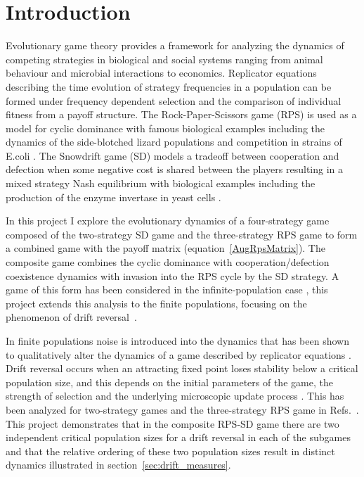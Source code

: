 \documentclass[%
 reprint,
 amsmath,amssymb,
 aps,
]{revtex4-2}
\begin{document}

\section{\label{sec:level1}Introduction}


Evolutionary game theory provides a framework for analyzing the dynamics of 
competing strategies in biological and social systems ranging from animal behaviour \cite{rps_lizard} and
microbial interactions \cite{cheating_microbes,yeast_snowdrift} to economics.
Replicator equations \cite{evolution_pop_dynamics,evolution_maynard} describing the 
time evolution of strategy frequencies in a population can be formed under frequency dependent selection 
and the comparison of individual fitness from a payoff structure. The Rock-Paper-Scissors game (RPS)
is used as a model for cyclic dominance with famous biological examples including the 
dynamics of the side-blotched lizard populations \cite{rps_lizard} and competition in strains of E.coli \cite{rps_ecoli}.
The Snowdrift game (SD) models a tradeoff between cooperation and defection when some negative cost is shared between 
the players resulting in a mixed strategy Nash equilibrium \cite{evolution_maynard} with biological examples including 
the production of the enzyme invertase in yeast cells \cite{yeast_snowdrift}. 

In this project I explore the evolutionary dynamics of a four-strategy
game composed of the two-strategy SD game and the three-strategy RPS game 
to form a combined game with the payoff matrix (equation~\ref{AugRpsMatrix}).
The composite game combines the cyclic dominance with cooperation/defection coexistence dynamics
with invasion into the RPS cycle by the SD strategy. A game of this form has been considered 
in the infinite-population case \cite{evolution_pop_dynamics}, this project extends this analysis to the 
finite populations, focusing on the phenomenon of drift reversal~\cite{drift_reversal_paper}.

In finite populations noise is introduced into the dynamics that has been shown 
to qualitatively alter the dynamics of a game described 
by replicator equations \cite{drift_reversal_paper,Claussen2007-zo,rps_cyclic_jens,general_moran_process}.
Drift reversal occurs when an attracting fixed point loses stability below a critical population size, 
and this depends on the initial parameters of the game, the strength of selection and the underlying
microscopic update process \cite{drift_reversal_paper}. This has been analyzed for 
two-strategy games and the three-strategy RPS game in Refs.~\cite{rps_cyclic_jens,drift_reversal_paper}.
This project demonstrates that in the composite RPS-SD game there are two independent critical population sizes
for a drift reversal in each of the subgames and that the relative ordering of these two population sizes 
result in distinct dynamics illustrated in section~\ref{sec:drift_measures}.
\end{document}
